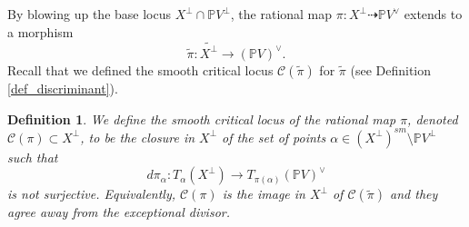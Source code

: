 \documentclass[12pt]{amsart}
\newtheorem{definition}[theorem]{Definition}
\newtheorem{lemma}[theorem]{Lemma}
\begin{document}
By blowing up the base locus $X^\perp\cap \mathbb PV^\perp$, the rational map $\pi:X^{\perp}\dashrightarrow\mathbb PV^{\vee}$
extends to a morphism
\[
\tilde\pi:\widetilde{X^\perp}\to (\mathbb PV)^\vee.
\]
Recall that we defined the smooth critical locus $\mathcal{C}(\tilde{\pi})$ for $\tilde{\pi}$ (see Definition \ref{def_discriminant}).

\begin{definition}\normalfont\label{def_smoothcrit_rat}
We define the \textit{smooth critical locus of the rational map $\pi$}, denoted
$\mathcal C(\pi)\subset X^\perp$, to be the closure in $X^\perp$ of the set of
points
$\alpha\in (X^\perp)^{sm}\setminus \mathbb PV^\perp$
such that
\[
d\pi_\alpha:T_\alpha(X^\perp)\to T_{\pi(\alpha)}(\mathbb PV)^\vee
\]
is not surjective.
Equivalently, $\mathcal C(\pi)$ is the image in $X^\perp$ of $\mathcal{C}(\tilde{\pi})$ and they agree away from the exceptional divisor.
\end{definition}
\end{document}

